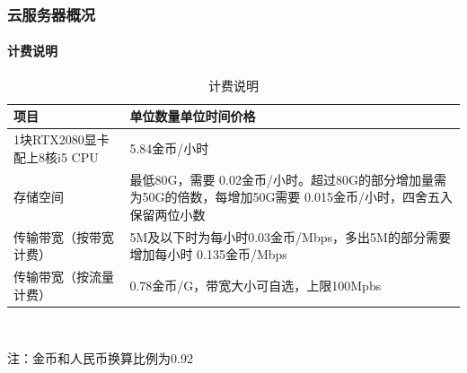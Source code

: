 \documentclass[10pt]{beamer}
\begin{document}
        \begin{frame}
            \frametitle{云服务器概况}
                \framesubtitle{计费说明}

                {\small
                \begin{table}[h]
                    {\centering
                    \caption{计费说明}
                        \begin{tabular}{|p{}|p{}|}
                            \hline
                            项目 & 单位数量单位时间价格 \\
                            \hline
                            1块RTX2080显卡配上8核i5 CPU & 5.84金币/小时 \\
                            \hline
                            存储空间 & 最低80G，需要 0.02金币/小时。超过80G的部分增加量需为50G的倍数，每增加50G需要 0.015金币/小时，四舍五入保留两位小数 \\
                            \hline
                            传输带宽（按带宽计费） & 5M及以下时为每小时0.03金币/Mbps，多出5M的部分需要增加每小时 0.135金币/Mbps \\
                            \hline
                            传输带宽（按流量计费） & 0.78金币/G，带宽大小可自选，上限100Mpbs \\
                            \hline
                        \end{tabular} \\
                    }
                \end{table}
                {\tiny \qquad \qquad 注：金币和人民币换算比例为0.92}
                }

        \end{frame}
\end{document}
